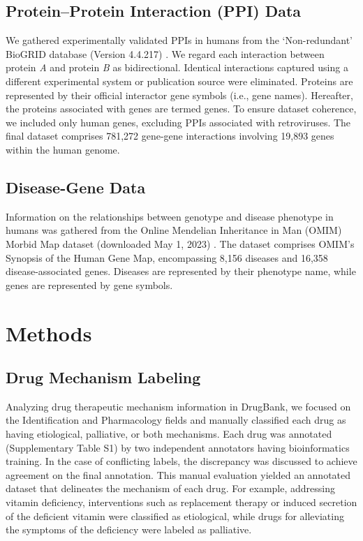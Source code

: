 \documentclass[journal,twoside,web]{ieeecolor}
\begin{document}
\subsection{Protein–Protein Interaction (PPI) Data}
\label{sec:PPI_data}
We gathered experimentally validated PPIs in humans from the `Non-redundant' BioGRID database (Version 4.4.217) \cite{oughtred2021biogrid}.
We regard each interaction between protein \textit{A} and protein \textit{B} as bidirectional.
Identical interactions captured using a different experimental system or publication source were eliminated.
Proteins are represented by their official interactor gene symbols (i.e., gene names).
Hereafter, the proteins associated with genes are termed genes.
To ensure dataset coherence, we included only human genes, excluding PPIs associated with retroviruses.
The final dataset comprises 781,272 gene-gene interactions involving 19,893 genes within the human genome.

\subsection{Disease-Gene Data}
\label{sec:OMIM_data}
Information on the relationships between genotype and disease phenotype in humans was gathered from the Online Mendelian Inheritance in Man (OMIM) Morbid Map dataset (downloaded May 1, 2023) \cite{amberger2015omim}.
The dataset comprises OMIM's Synopsis of the Human Gene Map, encompassing 8,156 diseases and 16,358 disease-associated genes.
Diseases are represented by their phenotype name, while genes are represented by gene symbols.

\section{Methods
}\label{sec:methods}

\subsection{Drug Mechanism Labeling}
\label{sec:annotation}
Analyzing drug therapeutic mechanism information in DrugBank, we focused on the Identification and Pharmacology fields and manually classified each drug as having etiological, palliative, or both mechanisms. Each drug was annotated (Supplementary Table S1) by two independent annotators having bioinformatics training. 
In the case of conflicting labels, the discrepancy was discussed to achieve agreement on the final annotation.
This manual evaluation yielded an annotated dataset that delineates the mechanism of each drug.
For example, addressing vitamin deficiency, interventions such as replacement therapy or induced secretion of the deficient vitamin were classified as etiological, while drugs for alleviating the symptoms of the deficiency were labeled as palliative.
\end{document}
